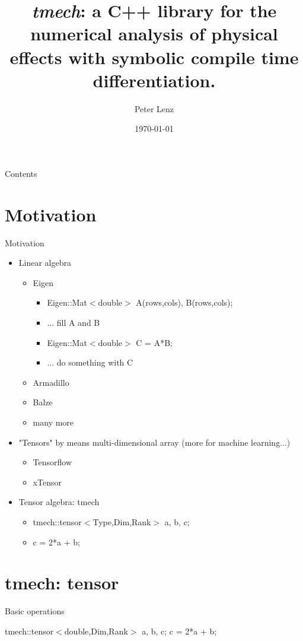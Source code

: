 \documentclass{beamer}
\title{\textit{tmech}: a C++ library for the numerical analysis of physical effects with symbolic compile time differentiation.}
\author{Peter Lenz}
\date{\today}
\begin{document}
\begin{frame}
    \titlepage 
\end{frame}



\begin{frame}{Contents}
    \tableofcontents
\end{frame}



\section{Motivation}
\begin{frame}{Motivation}
\begin{itemize}
    \item Linear algebra
    \begin{itemize}
    \item Eigen
    \begin{itemize}
    \item[] Eigen::Mat$<$double$>$ A(rows,cols), B(rows,cols);
    \item[] ... fill A and B
    \item[] Eigen::Mat$<$double$>$ C = A*B;
    \item[] ... do something with C
    \end{itemize}
    \item Armadillo
    \item Balze
    \item many more
    \end{itemize}
    \item "Tensors" by means  multi-dimensional array (more for machine learning...)
    \begin{itemize}
    \item Tensorflow
    \item xTensor
    \end{itemize}
    \item Tensor algebra: tmech
    \begin{itemize}
    \item[] tmech::tensor$<$Type,Dim,Rank$>$ a, b, c;
    \item[] c = 2*a + b;
    \end{itemize}
\end{itemize}

\end{frame}


\section{tmech: tensor}
\begin{frame}{Basic operations}
\begin{mdframed}
tmech::tensor$<$double,Dim,Rank$>$ a, b, c;
c = 2*a + b;
\end{mdframed}
\end{frame}
\end{document}
